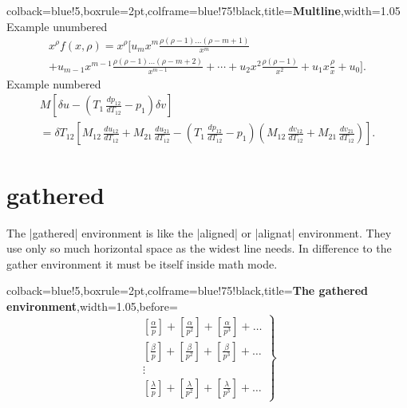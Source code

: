 \begin{tcblisting}{colback=blue!5,boxrule=2pt,colframe=blue!75!black,title=\textbf{Multline},width=1.05\textwidth}
Example unumbered
\begin{multline*}
x^{\rho}f(x, \rho) = x^{\rho} \Big [ u_{m}x^{m}\frac{\rho(\rho-1)\ldots (\rho-m+1)}{x^{m}} \\
                   + u_{m-1}x^{m-1}\frac{\rho(\rho-1)\ldots (\rho-m+2)}{x^{m-1}}+ \dotsb
                   + u_{2}x^{2}\frac{\rho(\rho-1)}{x^2}+u_{1}x\frac{\rho}{x}+u_0 \Big ].
\end{multline*}
Example  numbered
\begin{multline}
M \left[\delta u - \left(T_1\, \frac{dp_{12}}{dT_{12}} - p_1\right) \delta v\right] \\
= \delta T_{12} \left[M_{12}\, \frac{du_{12}}{dT_{12}} + M_{21}\, \frac{du_{21}}{dT_{12}}
  - \left(T_1\, \frac{dp_{12}}{dT_{12}} - p_1\right)
    \left(M_{12}\, \frac{dv_{12}}{dT_{12}}
        + M_{21}\, \frac{dv_{21}}{dT_{12}}\right)\right].
\end{multline}
\end{tcblisting}

\clearpage
\section{gathered}
The |gathered| environment is like the |aligned| or |alignat| environment. They use
only so much horizontal space as the widest line needs. In difference to the gather
environment it must be itself inside math mode.

\begin{tcblisting}{colback=blue!5,boxrule=2pt,colframe=blue!75!black,title=\textbf{The gathered environment},width=1.05\textwidth,before=\bigskip}
\[
  \left .
   \begin{gathered}
    \left [ \frac{\alpha}{p} \right ] +
    \left [ \frac{\alpha}{p^2} \right ] +
    \left [ \frac{\alpha}{p^3} \right ] +
    \ldots \\
    \left [ \frac{\beta}{p} \right ] +
    \left [ \frac{\beta}{p^2} \right ] +
    \left [ \frac{\beta}{p^3} \right ] +
    \ldots \\
      \vdots \\
    \left [ \frac{\lambda}{p} \right ] +
    \left [ \frac{\lambda}{p^2} \right ] +
    \left [ \frac{\lambda}{p^3} \right ] +
    \ldots
   \end{gathered}
  \right \} \tag{B}
\]
\end{tcblisting}

